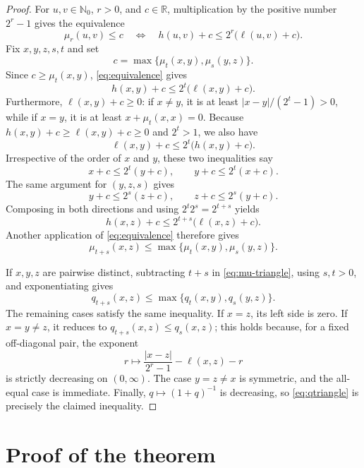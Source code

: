 \documentclass[11pt]{article}
\newcommand{\Nzero}{\mathbb N_0}
\begin{document}
\begin{proof}
For $u,v\in\Nzero$, $r>0$, and $c\in\mathbb R$, multiplication by the
positive number $2^r-1$ gives the equivalence
\begin{equation}\label{eq:equivalence}
 \mu_r(u,v)\le c
 \quad\Longleftrightarrow\quad
 h(u,v)+c\le 2^r\bigl(\ell(u,v)+c\bigr).
\end{equation}
Fix $x,y,z,s,t$ and set
\[
 c=\max\{\mu_t(x,y),\mu_s(y,z)\}.
\]
Since $c\ge\mu_t(x,y)$, \eqref{eq:equivalence} gives
\[
 h(x,y)+c\le2^t\bigl(\ell(x,y)+c\bigr).
\]
Furthermore, $\ell(x,y)+c\ge0$: if $x\ne y$, it is at least
$|x-y|/(2^t-1)>0$, while if $x=y$, it is at least
$x+\mu_t(x,x)=0$.  Because $h(x,y)+c\ge\ell(x,y)+c\ge0$ and $2^t>1$,
we also have
\[
 \ell(x,y)+c\le2^t\bigl(h(x,y)+c\bigr).
\]
Irrespective of the order of $x$ and $y$, these two inequalities say
\[
 x+c\le2^t(y+c),\qquad y+c\le2^t(x+c).
\]
The same argument for $(y,z,s)$ gives
\[
 y+c\le2^s(z+c),\qquad z+c\le2^s(y+c).
\]
Composing in both directions and using $2^t2^s=2^{t+s}$ yields
\[
 h(x,z)+c\le2^{t+s}\bigl(\ell(x,z)+c\bigr).
\]
Another application of \eqref{eq:equivalence} therefore gives
\begin{equation}\label{eq:mu-triangle}
 \mu_{t+s}(x,z)\le
 \max\{\mu_t(x,y),\mu_s(y,z)\}.
\end{equation}

If $x,y,z$ are pairwise distinct, subtracting $t+s$ in
\eqref{eq:mu-triangle}, using $s,t>0$, and exponentiating gives
\begin{equation}\label{eq:qtriangle}
 q_{t+s}(x,z)\le\max\{q_t(x,y),q_s(y,z)\}.
\end{equation}
The remaining cases satisfy the same inequality.  If $x=z$, its left side
is zero.  If $x=y\ne z$, it reduces to
$q_{t+s}(x,z)\le q_s(x,z)$; this holds because, for a fixed off-diagonal
pair, the exponent
\[
 r\longmapsto \frac{|x-z|}{2^r-1}-\ell(x,z)-r
\]
is strictly decreasing on $(0,\infty)$.  The case $y=z\ne x$ is symmetric,
and the all-equal case is immediate.  Finally,
$q\mapsto(1+q)^{-1}$ is decreasing, so \eqref{eq:qtriangle} is precisely the
claimed inequality.
\end{proof}

\section{Proof of the theorem}
\end{document}
